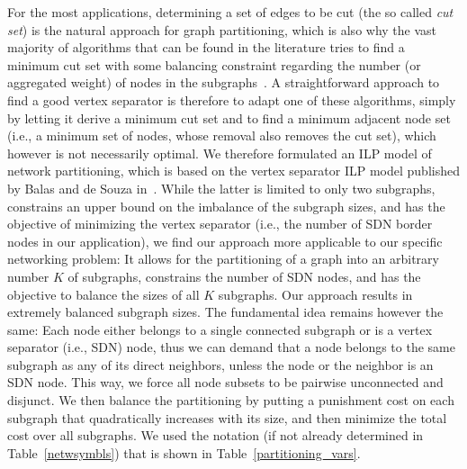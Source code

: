\documentclass[journal]{IEEEtran}
\begin{document}
\par For the most applications, determining a set of edges to be cut (the so called \emph{cut set}) is the natural approach for graph partitioning, which is also why the vast majority of algorithms that can be found in the literature tries to find a minimum cut set with some balancing constraint regarding the number (or aggregated weight) of nodes in the subgraphs~\cite{alpert}. A straightforward approach to find a good vertex separator is therefore to adapt one of these algorithms, simply by letting it derive a minimum cut set and to find a minimum adjacent node set (i.e., a minimum set of nodes, whose removal also removes the cut set), which however is not necessarily optimal. We therefore formulated an ILP model of network partitioning, which is based on the vertex separator ILP model published by Balas and de Souza in~\cite{Souza}. While the latter is limited to only two subgraphs, constrains an upper bound on the imbalance of the subgraph sizes, and has the objective of minimizing the vertex separator (i.e., the number of SDN border nodes in our application), we find our approach more applicable to our specific networking problem: It allows for the partitioning of a graph into an arbitrary number $K$ of subgraphs, constrains the number of SDN nodes, and has the objective to balance the sizes of all $K$ subgraphs. Our approach results in extremely balanced subgraph sizes. The fundamental idea remains however the same: Each node either belongs to a single connected subgraph or is a vertex separator (i.e., SDN) node, thus we can demand that a node belongs to the same subgraph as any of its direct neighbors, unless the node or the neighbor is an SDN node. This way, we force all node subsets to be pairwise unconnected and disjunct. We then balance the partitioning by putting a punishment cost on each subgraph that quadratically increases with its size, and then minimize the total cost over all subgraphs. We used the notation (if not already determined in Table~\ref{netwsymbls}) that is shown in Table~\ref{partitioning_vars}.
\end{document}
